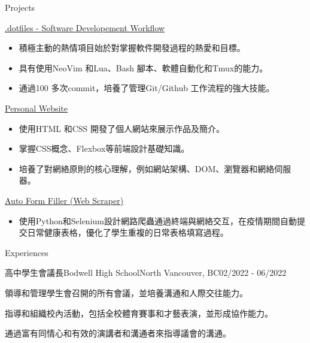 \documentclass{article}
\newlength{\tabin}
\newlength{\secsep}
\newcommand{\lineunder}{\vspace*{-8pt} \\ \hspace*{-6pt} \hrulefill \\ \vspace*{-15pt}}
\newenvironment{tabbedsection}[1]{
  \begin{list}{}{
      \setlength{\itemsep}{0pt}
      \setlength{\labelsep}{0pt}
      \setlength{\labelwidth}{0pt}
      \setlength{\leftmargin}{\tabin}
      \setlength{\rightmargin}{\tabin}
      \setlength{\listparindent}{0pt}
      \setlength{\parsep}{0pt}
      \setlength{\parskip}{0pt}
      \setlength{\partopsep}{0pt}
      \setlength{\topsep}{#1}
    }
  \item[]
}{\end{list}}
\newenvironment{resume_section}[1]{
  \filbreak
  \vspace{2\secsep}
  \textsc{\large#1}
  \lineunder
  \begin{tabbedsection}{\secsep}
}{\end{tabbedsection}}
\newenvironment{resume_subsection}[2][]{
  \textbf{#2} \hfill {\footnotesize #1} \hspace{-5.1em}
  \begin{tabbedsection}{0.5\secsep}
}{\end{tabbedsection}}
\newenvironment{subitems}{
  \renewcommand{\labelitemi}{-}
  \begin{itemize}
      \setlength{\labelsep}{1em}
}{\end{itemize}}
\newenvironment{resume_employer}[4]{
  \vspace{\secsep}
  \textbf{#1} {\footnotesize #3} \hfill {\footnotesize#4} \hspace{-1em} \\
  \small{#2}  
  \vspace{\secsep}
  \begin{tabbedsection}{0pt}
  \begin{subitems}
}{\end{subitems}\end{tabbedsection}}
\begin{document}
\begin{CJK*}{UTF8}{bsmi}
\begin{resume_section}{Projects}
  \begin{resume_subsection}[]{\href{https://github.com/TwinkletoesZen/.dotfiles}{.dotfiles - Software Developement Workflow \faGithub}}
    \begin{subitems}
      \item 積極主動的熱情項目始於對掌握軟件開發過程的熱愛和目標。
      \item 具有使用NeoVim 和Lua、Bash 腳本、軟體自動化和Tmux的能力。
      \item 通過100 多次commit，培養了管理Git/Github 工作流程的強大技能。
    \end{subitems}
  \end{resume_subsection}

  \begin{resume_subsection}[]{\href{https://github.com/TwinkletoesZen/Personal-Website}{Personal Website \faGithub}}
    \begin{subitems}
      \item 使用HTML 和CSS 開發了個人網站來展示作品及簡介。
      \item 掌握CSS概念、Flexbox等前端設計基礎知識。
      \item 培養了對網絡原則的核心理解，例如網站架構、DOM、瀏覽器和網絡伺服器。
    \end{subitems}
  \end{resume_subsection}

  \begin{resume_subsection}[]{\href{https://github.com/TwinkletoesZen/Auto-HealthCheck-Completer}{Auto Form Filler (Web Scraper) \faGithub}}
    \begin{subitems}
      \item 使用Python和Selenium設計網路爬蟲通過終端與網絡交互，在疫情期間自動提交日常健康表格，優化了學生重複的日常表格填寫過程。
    \end{subitems}
  \end{resume_subsection}
\end{resume_section}


\begin{resume_section}{Experiences}
  \begin{resume_employer}{高中學生會議長}{Bodwell High School}{North Vancouver, BC}{02/2022 - 06/2022}
    \item 領導和管理學生會召開的所有會議，並培養溝通和人際交往能力。
    \item 指導和組織校內活動，包括全校體育賽事和才藝表演，並形成協作能力。
    \item 通過富有同情心和有效的演講者和溝通者來指導議會的溝通。
  \end{resume_employer}


\end{resume_section}
\end{CJK*}
\end{document}
